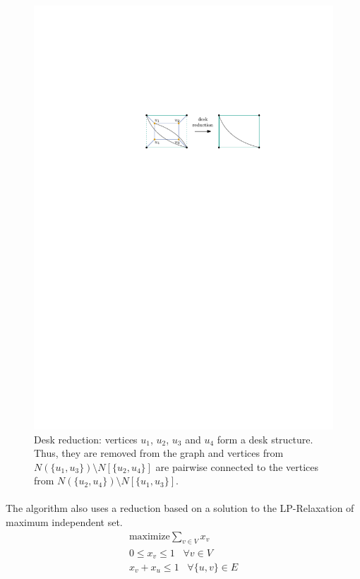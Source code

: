 \documentclass[12pt,a4paper,twoside]{scrartcl}
\numberwithin{equation}{section}
\begin{document}
\begin{figure}[htb]
	\captionsetup{belowskip=-1em}
	\includegraphics[scale=1.5]{images/desk_red}
	\centering
	\caption{Desk reduction: vertices $u_1$, $u_2$, $u_3$ and $u_4$ form a desk structure. Thus, they are removed from the graph and vertices from $N(\{u_1,u_3\})\setminus N[\{u_2,u_4\}]$ are pairwise connected to the vertices from $N(\{u_2,u_4\})\setminus N[\{u_1,u_3\}]$. }
	\label{fig:desk_red}
\end{figure}

\paragraph{}
The algorithm also uses a reduction based on a solution to the LP-Relaxation of maximum independent set.
\begin{gather*}
\text{maximize} \sum_{v\in V}x_v\\
0\leq x_v\leq 1 \;\;\; \forall v\in V\\
x_v + x_u\leq 1 \;\;\; \forall \{u,v\}\in E
\end{gather*}
\end{document}
